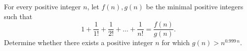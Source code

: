 \documentclass{article}
\begin{document}
\setlength{\parindent}{0pt}
For every positive integer \(\displaystyle n\), let \(\displaystyle f(n),g(n)\) be the minimal positive integers such that$$1+\frac{1}{1!}+\frac{1}{2!}+\ldots+\frac{1}{n!}=\frac{f(n)}{g(n)}.$$Determine whether there exists a positive integer \(\displaystyle n\) for which \(\displaystyle g(n)>n^{0.999\, n}\).
\end{document}
